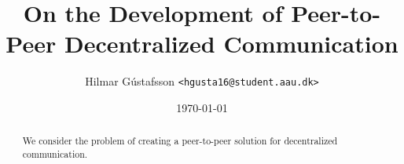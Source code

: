 \documentclass[11pt,twocolumn]{article}
\title{On the Development of Peer-to-Peer Decentralized Communication}
\author{Hilmar Gústafsson \texttt{<hgusta16@student.aau.dk>}}
\date{\today}
\begin{document}
\maketitle
\begin{abstract}
    We consider the problem of creating a peer-to-peer solution for decentralized communication.
\end{abstract}







\end{document}
